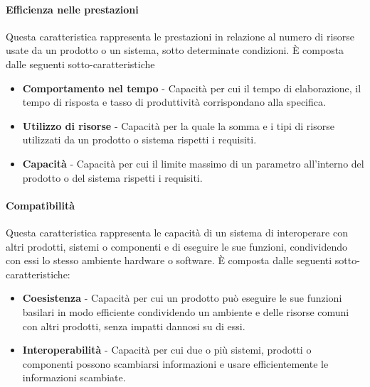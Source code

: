 \documentclass[../main.tex]{subfiles}
\begin{document}
\paragraph{Efficienza nelle prestazioni}
Questa caratteristica rappresenta le prestazioni in relazione al numero di risorse usate da un prodotto o un sistema, sotto determinate condizioni.
È composta dalle seguenti sotto-caratteristiche
\begin{itemize}
\item \textbf{Comportamento nel tempo} - Capacità per cui il tempo di elaborazione, il tempo di risposta e tasso di produttività corrispondano alla specifica.
\item \textbf{Utilizzo di risorse} - Capacità per la quale la somma e i tipi di risorse utilizzati da un prodotto o sistema rispetti i requisiti.
\item \textbf{Capacità} - Capacità per cui il limite massimo di un parametro all'interno del prodotto o del sistema rispetti i requisiti.
\end{itemize}

\paragraph{Compatibilità}
Questa caratteristica rappresenta le capacità di un sistema di interoperare con altri prodotti, sistemi o componenti e di eseguire le sue funzioni, condividendo con essi lo stesso ambiente hardware o software. È composta dalle seguenti sotto-caratteristiche:
\begin{itemize}
\item \textbf{Coesistenza} - Capacità per cui un prodotto può eseguire le sue funzioni basilari in modo efficiente condividendo un ambiente e delle risorse comuni con altri prodotti, senza impatti dannosi su di essi.
\item \textbf{Interoperabilità} - Capacità per cui due o più sistemi, prodotti o componenti possono scambiarsi informazioni e usare efficientemente le informazioni scambiate.
\end{itemize}
\end{document}

